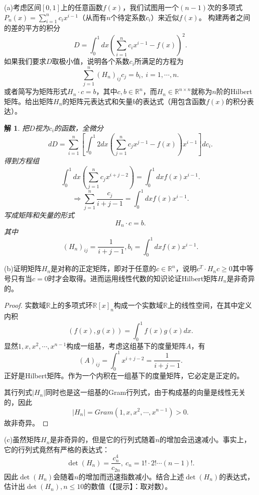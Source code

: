 \documentclass[10pt]{ctexart}
\newtheorem*{solution}{解}
\begin{document}
(a)考虑区间$[0,1]$上的任意函数$f(x)$，我们试图用一个$(n-1)$次的多项式$P_n(x)=\sum_{i=1}^n c_ix^{i-1}$（从而有$n$个待定系数$c_i$）来近似$f(x)$。
构建两者之间的差的平方的积分
$$D=\int_{0}^{1}dx\left(\sum\limits_{i=1}^n c_ix^{i-1}-f(x)\right)^2.$$
如果我们要求$D$取极小值，说明各个系数$c_i$所满足的方程为
$$\sum\limits_{j=1}^{n}(H_n)_{ij}c_j=b_i,\ i=1,\cdots,n.$$
或者简写为矩阵形式$H_n\cdot c=b$，其中$c,b\in\mathbb{R}^n$，而$H_n\in\mathbb{R}^{n\times n}$就称为$n$阶的Hilbert矩阵。给出矩阵$H_n$的矩阵元表达式和矢量$b$的表达式（用包含函数$f(x)$的积分表达）。
\begin{solution}
    把$D$视为$c_i$的函数，全微分
    $$dD=\sum\limits_{i=1}^{n}\left[\int_{0}^{1}2dx \left(\sum\limits_{j=1}^n c_jx^{j-1}-f(x)\right)x^{i-1}\right]dc_i.$$
    得到方程组
    $$\int_{0}^{1}dx\left(\sum\limits_{j=1}^{n}c_jx^{i+j-2}\right)=\int_0^1dxf(x)x^{i-1}.$$
    $$\Rightarrow\sum\limits_{j=1}^n\frac{c_j}{i+j-1}=\int_0^1dxf(x)x^{i-1}.$$
    写成矩阵和矢量的形式
    $$H_n\cdot c=b.$$
    其中
    $$(H_n)_{ij}=\frac{1}{i+j-1},b_i=\int_{0}^{1}dx f(x)x^{i-1}.$$
\end{solution}
(b)证明矩阵$H_n$是对称的正定矩阵，即对于任意的$c\in\mathbb{R}^n$，说明$c^T\cdot H_nc\geqslant0$其中等号只有当$c=0$时才会取得。进而运用线性代数的知识论证Hilbert矩阵$H_n$是非奇异的。
\begin{proof}
    实数域$\mathbb{R}$上的多项式环$\mathbb{R}[x]_n$构成一个实数域$\mathbb{R}$上的线性空间，在其中定义内积
    $$(f(x),g(x))=\int_0^1 f(x)g(x)dx.$$
    显然$1,x,x^2,\cdots,x^{n-1}$构成一组基，考虑这组基下的度量矩阵$A$，有
    $$(A)_{ij}=\int_0^1x^{i+j-2}=\frac{1}{i+j-1}.$$
    正好是Hilbert矩阵。作为一个内积在一组基下的度量矩阵，它必定是正定的。
    
    其行列式$\lvert H_n \rvert$同时也是这一组基的Gram行列式，由于构成基的向量是线性无关的，因此
    $$\lvert H_n\rvert=Gram(1,x,x^2,\cdots,x^{n-1})>0.$$
    故非奇异。
\end{proof}
(c)虽然矩阵$H_n$是非奇异的，但是它的行列式随着$n$的增加会迅速减小。事实上，它的行列式竟然有严格的表达式：
$$\det(H_n)=\frac{c_n^4}{c_{2n}},\ c_n=1!\cdot 2!\cdots(n-1)!.$$
因此$\det(H_n)$会随着$n$的增加而迅速指数减小。结合上述$\det(H_n)$的表达式，估计出$\det(H_n),n\leqslant 10$的数值（【提示】：取对数）。
\end{document}
